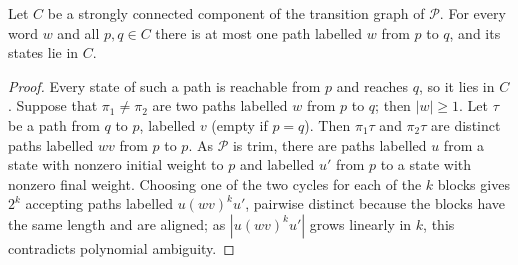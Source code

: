 \begin{lemma}\label{lem:uniquepath}
Let $C$ be a strongly connected component of the transition graph of $\mathcal P$. For every word
$w$ and all $p,q\in C$ there is at most one path labelled $w$ from $p$ to $q$, and its states lie in
$C$.
\end{lemma}
\begin{proof}
Every state of such a path is reachable from $p$ and reaches $q$, so it lies in $C$. Suppose that
$\pi_1\ne\pi_2$ are two paths labelled $w$ from $p$ to $q$; then $|w|\ge1$. Let $\tau$ be a path from
$q$ to $p$, labelled $v$ (empty if $p=q$). Then $\pi_1\tau$ and $\pi_2\tau$ are distinct paths labelled $wv$ from $p$ to $p$. As
$\mathcal P$ is trim, there are paths labelled $u$ from a state with nonzero initial weight to $p$ and
labelled $u'$ from $p$ to a state with nonzero final weight. Choosing one of the two cycles for each
of the $k$ blocks gives $2^k$ accepting paths labelled $u(wv)^ku'$, pairwise distinct because the blocks
have the same length and are aligned; as $|u(wv)^ku'|$ grows linearly in $k$, this contradicts polynomial
ambiguity.
\end{proof}

